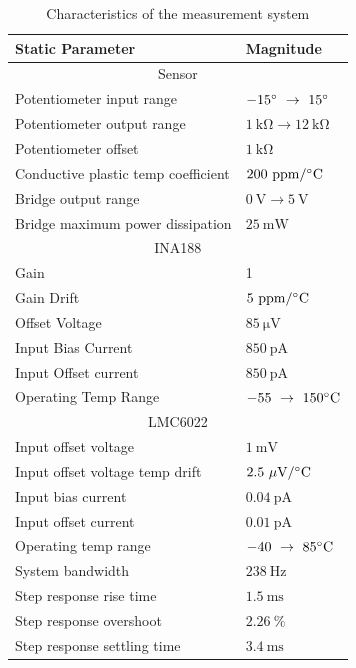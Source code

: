 \documentclass[10pt,twocolumn]{witseiepaper}
\begin{document}
\begin{table}[h!]
	\caption{Characteristics of the measurement system} \label{tab:static}
	\begin{tabular}{|p{}| p{}|}
		\hline
		\textbf{Static Parameter} & \textbf{Magnitude} \\ \hline
		\multicolumn{2}{|c|}{Sensor} \\ \hline
		Potentiometer input range & $-15^\circ~\rightarrow~15^\circ$\\
		Potentiometer output range & $\mathrm{1~k\Omega \rightarrow 12~k\Omega}$\\
		Potentiometer offset & $\mathrm{1~k\Omega}$\\
		Conductive plastic temp coefficient & $\mathrm{200~ppm/^\circ C}$ \\
		Bridge output range & $\mathrm{0~V \rightarrow 5~V}$\\
		Bridge maximum power dissipation & $\mathrm{25~mW}$ \\ \hline
		\multicolumn{2}{|c|}{INA188} \\ \hline
		Gain & 1\\
		Gain Drift & $\mathrm{5~ppm/^\circ C}$ \\
		Offset Voltage & $\mathrm{85~\mu V}$ \\
		Input Bias Current & $\mathrm{850~pA}$\\
		Input Offset current & $\mathrm{850~pA}$\\
		Operating Temp Range & $\mathrm{-55~\rightarrow~150^\circ C}$\\ \hline
		\multicolumn{2}{|c|}{LMC6022} \\ \hline
		Input offset voltage & $\mathrm{1~m V}$ \\
		Input offset voltage temp drift& $\mathrm{2.5~\mu V/ ^\circ C}$ \\
		Input bias current & $\mathrm{0.04~pA}$\\
		Input offset current & $\mathrm{0.01~pA}$\\
		Operating temp range & $\mathrm{-40~\rightarrow~85^\circ C}$\\ \hline
		System bandwidth & $238~\mathrm{Hz}$ \\
		Step response rise time & $1.5~\mathrm{ms}$ \\
		Step response overshoot & $2.26~\%$ \\
		Step response settling time & $3.4~\mathrm{ms}$ \\
		\hline
	\end{tabular}
\end{table}
\end{document}
